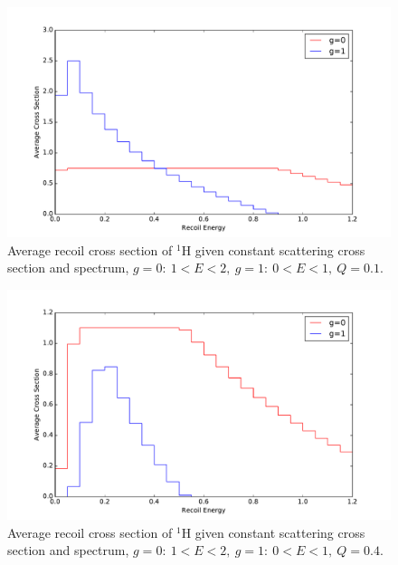 \documentclass[review]{elsarticle}
\begin{document}
\begin{figure}[p]
	\centering
	\includegraphics[width=1\linewidth]{inelastic_simple_1.pdf}
	\caption{Average recoil cross section of $^1$H given constant scattering cross section and spectrum, $g=0:~ 1 < E < 2,~g=1:~ 0 < E < 1,~Q=0.1$.}
	\label{fig:inelastic_simple_1}
\end{figure}

\begin{figure}[p]
	\centering
	\includegraphics[width=1\linewidth]{inelastic_simple_4.pdf}
	\caption{Average recoil cross section of $^1$H given constant scattering cross section and spectrum, $g=0:~ 1 < E < 2,~g=1:~ 0 < E < 1,~Q=0.4$.}
	\label{fig:inelastic_simple_4}
\end{figure}
\end{document}
